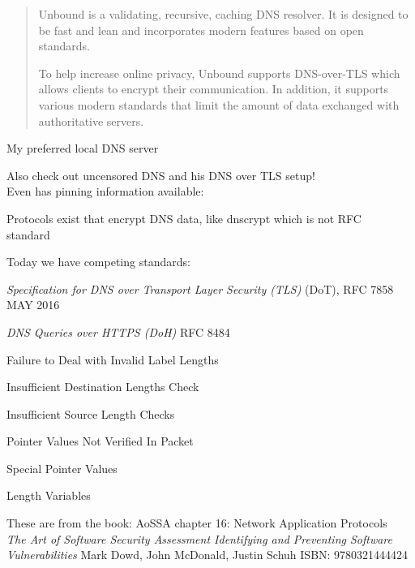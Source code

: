 \documentclass[Screen16to9,17pt]{foils}
\begin{document}

\begin{quote}
Unbound is a validating, recursive, caching DNS resolver. It is designed to be fast and lean and incorporates modern features based on open standards.

To help increase online privacy, Unbound supports DNS-over-TLS which allows clients to encrypt their communication. In addition, it supports various modern standards that limit the amount of data exchanged with authoritative servers.
\end{quote}


My preferred local DNS server

Also check out uncensored DNS and his DNS over TLS setup!\\
Even has pinning information available:\\ {\small{}}







\begin{list1}
\item Protocols exist that encrypt DNS data, like dnscrypt which is not RFC\\ standard  
\item Today we have competing standards:
\item
\emph{Specification for DNS over Transport Layer Security (TLS)} (DoT), RFC 7858 MAY 2016\\

\item \emph{DNS Queries over HTTPS (DoH)} RFC 8484


\end{list1}



\begin{list2}
\item Failure to Deal with Invalid Label Lengths
\item Insufficient Destination Lengths Check
\item Insufficient Source Length Checks
\item Pointer Values Not Verified In Packet
\item Special Pointer Values
\item Length Variables
\item These are from the book: AoSSA chapter 16: Network Application Protocols\\
\emph{The Art of Software Security Assessment Identifying and Preventing
Software Vulnerabilities}
Mark Dowd, John McDonald, Justin Schuh ISBN: 9780321444424
\end{list2}
\end{document}
